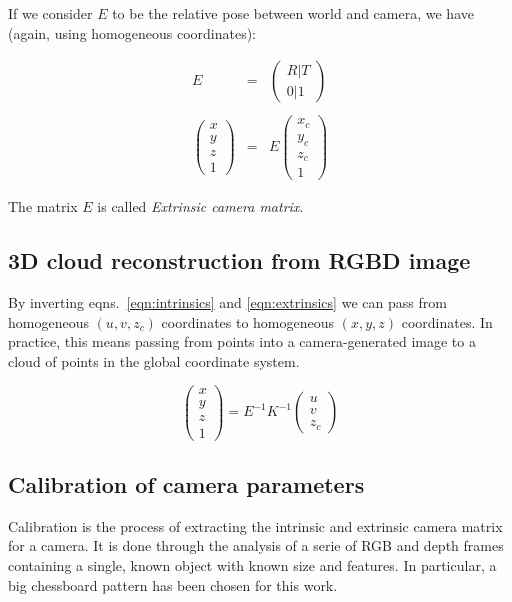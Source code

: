 If we consider $E$ to be the relative pose between world and camera, we have
(again, using homogeneous coordinates):

\begin{eqnarray}
  E&=&\left(
  \begin{array}{c}
  R | T \\
  0 | 1
\end{array}
\right) \\ 
\nonumber \\
\left(\begin{array}{c}x\\y\\z\\1\end{array}\right)
  &=&
  E
\left(\begin{array}{c}x_c\\y_c\\z_c\\1\end{array}\right) \label{eqn:extrinsics}
\end{eqnarray}

The matrix $E$ is called \emph{Extrinsic camera matrix}.

\subsection{3D cloud reconstruction from RGBD image}
\label{sec:cloud-reconstruction}
By inverting eqns.~\ref{eqn:intrinsics} and \ref{eqn:extrinsics} we can pass from homogeneous
$(u,v,z_c)$ coordinates to homogeneous $(x,y,z)$ coordinates. In practice, this
means passing from points into a camera-generated image to a cloud of points in
the global coordinate system.

\begin{equation}
  \left(\begin{array}{c}x\\y\\z\\1\end{array}\right)
  =E^{-1}K^{-1}\left(\begin{array}{c}u\\v\\z_c\end{array}\right)
\end{equation}

\subsection{Calibration of camera parameters} \label{sec:camera-calibration}
Calibration is the process of extracting the intrinsic and extrinsic
camera matrix for a camera. It is done through the analysis of a serie of RGB and depth
frames containing a single, known object with known size and features. In
particular, a big chessboard pattern has been chosen for this work.

